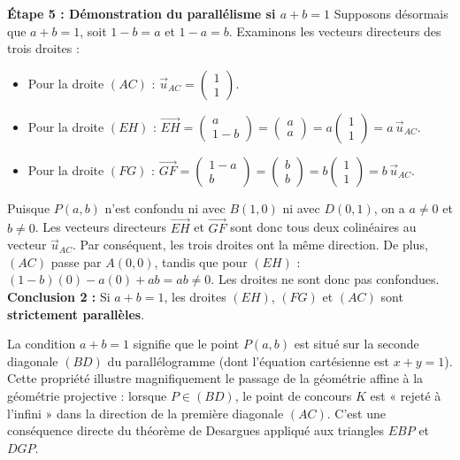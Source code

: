 \documentclass[11pt,a4paper]{article}
\newcommand{\vect}[1]{\overrightarrow{#1}}
\begin{document}
\begin{correctionbox}
\textbf{Étape 5 : Démonstration du parallélisme si $a + b = 1$}
Supposons désormais que $a + b = 1$, soit $1 - b = a$ et $1 - a = b$.
Examinons les vecteurs directeurs des trois droites :
\begin{itemize}[leftmargin=1cm]
    \item Pour la droite $(AC)$ : $\vec{u}_{AC} = \begin{pmatrix} 1 \\ 1 \end{pmatrix}$.
    \item Pour la droite $(EH)$ : $\vect{EH} = \begin{pmatrix} a \\ 1 - b \end{pmatrix} = \begin{pmatrix} a \\ a \end{pmatrix} = a \begin{pmatrix} 1 \\ 1 \end{pmatrix} = a\,\vec{u}_{AC}$.
    \item Pour la droite $(FG)$ : $\vect{GF} = \begin{pmatrix} 1 - a \\ b \end{pmatrix} = \begin{pmatrix} b \\ b \end{pmatrix} = b \begin{pmatrix} 1 \\ 1 \end{pmatrix} = b\,\vec{u}_{AC}$.
\end{itemize}
Puisque $P(a, b)$ n'est confondu ni avec $B(1, 0)$ ni avec $D(0, 1)$, on a $a \neq 0$ et $b \neq 0$.
Les vecteurs directeurs $\vect{EH}$ et $\vect{GF}$ sont donc tous deux colinéaires au vecteur $\vec{u}_{AC}$.
Par conséquent, les trois droites ont la même direction.
De plus, $(AC)$ passe par $A(0,0)$, tandis que pour $(EH)$ : $(1-b)(0) - a(0) + ab = ab \neq 0$. Les droites ne sont donc pas confondues.
\textbf{Conclusion 2 :} Si $a + b = 1$, les droites $(EH)$, $(FG)$ et $(AC)$ sont \textbf{strictement parallèles}.
\end{correctionbox}

\begin{remarkbox}
La condition $a + b = 1$ signifie que le point $P(a, b)$ est situé sur la seconde diagonale $(BD)$ du parallélogramme (dont l'équation cartésienne est $x + y = 1$).
Cette propriété illustre magnifiquement le passage de la géométrie affine à la géométrie projective : lorsque $P \in (BD)$, le point de concours $K$ est « rejeté à l'infini » dans la direction de la première diagonale $(AC)$. C'est une conséquence directe du théorème de Desargues appliqué aux triangles $E B P$ et $D G P$.
\end{remarkbox}
\end{document}
